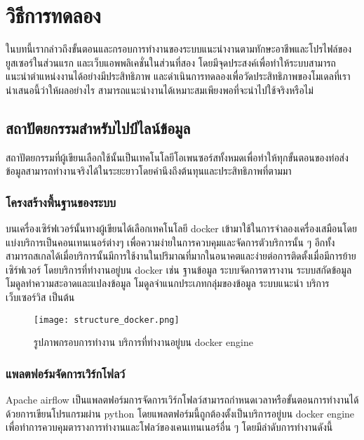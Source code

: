 \chapter{วิธีการทดลอง}
\label{chapter:experiment}

ในบทนี้เรากล่าวถึงขั้นตอนและกรอบการทำงานของระบบแนะนำงานตามทักษะอาชีพและโปรไฟล์ของยูสเซอร์ในส่วนแรก และเว็บแอพพลิเคชั่นในส่วนที่สอง โดยมีจุดประสงค์เพื่อทำให้ระบบสามารถแนะนำตำแหน่งงานได้อย่างมีประสิทธิภาพ และดำเนินการทดลองเพื่อวัดประสิทธิภาพของโมเดลที่เรานำเสนอนี้ว่าให้ผลอย่างไร สามารถแนะนำงานได้เหมาะสมเพียงพอที่จะนำไปใช้จริงหรือไม่

\section{สถาปัตยกรรมสำหรับไปป์ไลน์ข้อมูล}
สถาปัตยกรรมที่ผู้เขียนเลือกใช้นั้นเป็นเทคโนโลยีโอเพนซอร์สทั้งหมดเพื่อทำให้ทุกขั้นตอนของท่อส่งข้อมูลสามารถทำงานจริงได้ในระยะยาวโดยคำนึงถึงต้นทุนและประสิทธิภาพที่ตามมา
\subsection{โครงสร้างพื้นฐานของระบบ} 
บนเครื่องเซิร์ฟเวอร์นั้นทางผู้เขียนได้เลือกเทคโนโลยี docker เข้ามาใช้ในการจำลองเครื่องเสมือนโดยแบ่งบริการเป็นคอนเทนเนอร์ต่างๆ 
เพื่อความง่ายในการควบคุมและจัดการตัวบริการนั้น ๆ อีกทั้งสามารถสเกลได้เมื่อบริการนั้นมีการใช้งานในปริมาณที่มากในอนาคตและง่ายต่อการติดตั้งเมื่อมีการย้ายเซิร์ฟเวอร์
โดยบริการที่ทำงานอยู่บน docker เช่น ฐานข้อมูล ระบบจัดการตารางาน ระบบสกัดข้อมูล โมดูลทำความสะอาดและแปลงข้อมูล โมดูลจำแนกประเภทกลุ่มของข้อมูล ระบบแนะนำ บริการเว็บเซอร์วิส เป็นต้น
\newline
\begin{figure}[!h]
  \centering
  \texttt{[image: structure\_docker.png]}  
  \caption{รูปภาพกรอบการทำงาน บริการที่ทำงานอยู่บน docker engine}
  \label{Fig:data-collection}
\end{figure}

\subsection{แพลตฟอร์มจัดการเวิร์กโฟลว์}
Apache airflow เป็นแพลตฟอร์มการจัดการเวิร์กโฟลว์สามารถกำหนดเวลาหรือขั้นตอนการทำงานได้ด้วยการเขียนโปรแกรมผ่าน python โดยแพลตฟอร์มนี้ถูกต้องตั้งเป็นบริการอยู่บน docker engine 
เพื่อทำการควบคุมตารางการทำงานและโฟลว์ของเคนเทนเนอร์อื่น ๆ โดยมีลำดับการทำงานดังนี้

